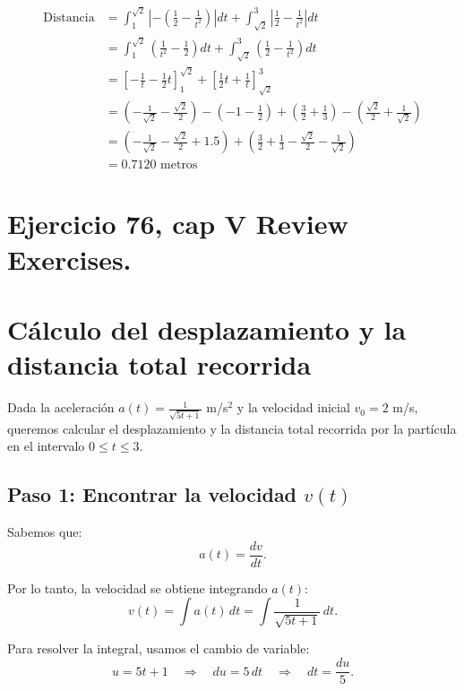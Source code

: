 \documentclass[11pt,letterpaper]{article}
\begin{document}
\begin{align*}
  \text{Distancia} &= \int_{1}^{\sqrt{2}} \left|-\left(\frac{1}{2} - \frac{1}{t^2}\right)\right|dt + \int_{\sqrt{2}}^{3} \left|\frac{1}{2} - \frac{1}{t^2}\right|dt \\
  &= \int_{1}^{\sqrt{2}} \left(\frac{1}{t^2} - \frac{1}{2}\right)dt + \int_{\sqrt{2}}^{3} \left(\frac{1}{2} - \frac{1}{t^2}\right)dt \\
  &= \left[-\frac{1}{t} - \frac{1}{2}t\right]_{1}^{\sqrt{2}} + \left[\frac{1}{2}t + \frac{1}{t}\right]_{\sqrt{2}}^{3} \\
  &= \left(-\frac{1}{\sqrt{2}} - \frac{\sqrt{2}}{2}\right) - \left(-1 - \frac{1}{2}\right) + \left(\frac{3}{2} + \frac{1}{3}\right) - \left(\frac{\sqrt{2}}{2} + \frac{1}{\sqrt{2}}\right) \\
  &= \left(-\frac{1}{\sqrt{2}} - \frac{\sqrt{2}}{2} + 1.5\right) + \left(\frac{3}{2} + \frac{1}{3} - \frac{\sqrt{2}}{2} - \frac{1}{\sqrt{2}}\right) \\
  & = 0.7120 \text{ metros}
  \end{align*}

\section{Ejercicio 76, cap V Review Exercises.}
\section*{Cálculo del desplazamiento y la distancia total recorrida}

Dada la aceleración \(a(t) = \frac{1}{\sqrt{5t + 1}}\) m/s\(^2\) y la velocidad inicial \(v_0 = 2\) m/s, queremos calcular el desplazamiento y la distancia total recorrida por la partícula en el intervalo \(0 \leq t \leq 3\).

\subsection*{Paso 1: Encontrar la velocidad \(v(t)\)}

Sabemos que:
\[
a(t) = \frac{dv}{dt}.
\]

Por lo tanto, la velocidad se obtiene integrando \(a(t)\):
\[
v(t) = \int a(t) \, dt = \int \frac{1}{\sqrt{5t + 1}} \, dt.
\]

Para resolver la integral, usamos el cambio de variable:
\[
u = 5t + 1 \quad \Rightarrow \quad du = 5 \, dt \quad \Rightarrow \quad dt = \frac{du}{5}.
\]
\end{document}
